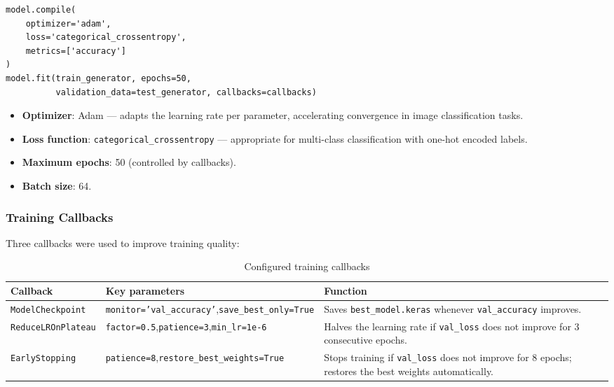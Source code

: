 \documentclass[12pt, a4paper]{article}
\begin{document}
\begin{lstlisting}[style=python]
model.compile(
    optimizer='adam',
    loss='categorical_crossentropy',
    metrics=['accuracy']
)
model.fit(train_generator, epochs=50,
          validation_data=test_generator, callbacks=callbacks)
\end{lstlisting}

\begin{itemize}
  \item \textbf{Optimizer}: Adam --- adapts the learning rate per parameter, accelerating
        convergence in image classification tasks.
  \item \textbf{Loss function}: \texttt{categorical\_crossentropy} --- appropriate for
        multi-class classification with one-hot encoded labels.
  \item \textbf{Maximum epochs}: 50 (controlled by callbacks).
  \item \textbf{Batch size}: 64.
\end{itemize}

\subsubsection{Training Callbacks}

Three callbacks were used to improve training quality:

\begin{table}[H]
  \centering
  \caption{Configured training callbacks}
  \begin{tabular}{p{3.5cm}p{4.5cm}p{5.5cm}}
    \toprule
    \textbf{Callback} & \textbf{Key parameters} & \textbf{Function} \\
    \midrule
    \texttt{ModelCheckpoint} &
      \texttt{monitor='val\_accuracy'},\newline\texttt{save\_best\_only=True} &
      Saves \texttt{best\_model.keras} whenever \texttt{val\_accuracy} improves. \\
    \addlinespace
    \texttt{ReduceLROnPlateau} &
      \texttt{factor=0.5},\newline\texttt{patience=3},\newline\texttt{min\_lr=1e-6} &
      Halves the learning rate if \texttt{val\_loss} does not improve for 3 consecutive
      epochs. \\
    \addlinespace
    \texttt{EarlyStopping} &
      \texttt{patience=8},\newline\texttt{restore\_best\_weights=True} &
      Stops training if \texttt{val\_loss} does not improve for 8 epochs; restores the
      best weights automatically. \\
    \bottomrule
  \end{tabular}
\end{table}
\end{document}
